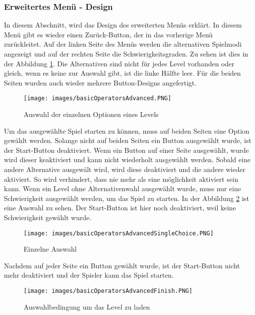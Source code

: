 \subsubsection{Erweitertes Menü - Design}
In diesem Abschnitt, wird das Design des erweiterten Menüs erklärt. In diesem Menü gibt es wieder einen Zurück-Button, der in das vorherige Menü zurückleitet. Auf der linken Seite des Menüs werden die alternativen Spielmodi angezeigt und auf der rechten Seite die Schwierigkeitsgraden. Zu sehen ist dies in der Abbildung \ref{AdvancedMenü}. Die Alternativen sind nicht für jedes Level vorhanden oder gleich, wenn es keine zur Auswahl gibt, ist die linke Hälfte  leer. Für die beiden Seiten wurden auch wieder mehrere Button-Designs angefertigt.
\begin{figure}[htbp]
  \centering
  \texttt{[image: images/basicOperatorsAdvanced.PNG]}
  \caption{Auswahl der einzelnen Optionen eines Levels}
  \label{AdvancedMenü}
\end{figure}
Um das ausgewählte Spiel starten zu können, muss auf beiden Seiten eine Option gewählt werden. Solange nicht auf beiden Seiten ein Button ausgewählt wurde, ist der Start-Button deaktiviert. Wenn ein Button auf einer Seite ausgewählt, wurde wird dieser keaktiviert und kann nicht wiederholt ausgewählt werden. Sobald eine andere Alternative ausgewält wird, wird diese deaktiviert und die andere wieder aktiviert. So wird verhindert, dass nie mehr als eine möglichkeit aktiviert sein kann. Wenn ein Level ohne Alternativenwahl ausgewählt wurde, muss nur eine Schwierigkeit ausgewählt werden, um das Spiel zu starten. In der Abbildung \ref{singleChoice} ist eine Auswahl zu sehen. Der Start-Button ist hier noch deaktiviert, weil keine Schwierigkeit gewählt wurde. 
\begin{figure}[htbp]
  \centering
  \texttt{[image: images/basicOperatorsAdvancedSingleChoice.PNG]}
  \caption{Einzelne Auswahl}
  \label{singleChoice}
\end{figure}
Nachdem auf jeder Seite ein Button gewählt wurde, ist der Start-Button nicht mehr deaktiviert und der Spieler kann das Spiel starten.
\begin{figure}[htbp]
  \centering
  \texttt{[image: images/basicOperatorsAdvancedFinish.PNG]}
  \caption{Auswahlbedingung um das Level zu laden}
  \label{startLevel}
\end{figure}

